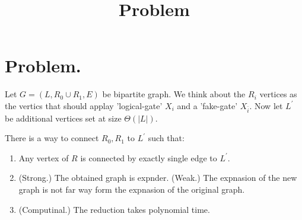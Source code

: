 \documentclass[manuscript,screen,review]{acmart}
\begin{document}


\title{Problem} 

\ifdefined\ACM
\else
  \maketitle
\fi
%
\ifdefined\ACM
  \maketitle
\fi


\section{Problem.}

Let $G=(L, R_{0}\cup R_{1}, E)$ be bipartite graph. We think about the $R_{i}$ vertices as the vertics that should applay 'logical-gate' $X_{i}$ and a 'fake-gate' $X_{\bar{i}}$. Now let $L^{\prime}$ be additional vertices set at size $\Theta\left( |L| \right)$. 

\begin{claim}
  There is a way to connect $R_{0},R_{1}$ to $L^{\prime}$ such that: 
  \begin{enumerate}
    \item Any vertex of $R$ is connected by exactly single edge to $L^{\prime}$. 
    \item (Strong.) The obtained graph is expnder. (Weak.) The expnasion of the new graph is not far way form the expnasion of the original graph.
    \item (Computinal.) The reduction takes polynomial time.   
  \end{enumerate}
\end{claim}
\end{document}
